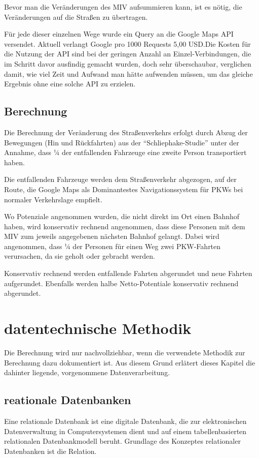 \documentclass[fontsize=12pt,a4paper]{scrreprt}
\begin{document}
Bevor man die Veränderungen des MIV aufsummieren kann, ist es nötig, die Veränderungen auf die Straßen zu übertragen.

Für jede dieser einzelnen Wege wurde ein Query an die Google Maps API versendet. Aktuell verlangt Google pro 1000 Requests 5,00 USD.\@ Die Kosten für die Nutzung der API sind bei der geringen Anzahl an Einzel-Verbindungen, die im Schritt davor ausfindig gemacht wurden, doch sehr überschaubar, verglichen damit, wie viel Zeit und Aufwand man hätte aufwenden müssen, um das gleiche Ergebnis ohne eine solche API zu erzielen.

\section{Berechnung}

Die Berechnung der Veränderung des Straßenverkehrs erfolgt durch Abzug der Bewegungen (Hin und Rückfahrten) aus der \enquote{Schliephake-Studie} unter der Annahme, dass ¼ der entfallenden Fahrzeuge eine zweite Person transportiert haben.

Die entfallenden Fahrzeuge werden dem Straßenverkehr abgezogen, auf der Route, die Google Maps als Dominantestes Navigationssystem für PKWs bei normaler Verkehrslage empfielt.

Wo Potenziale angenommen wurden, die nicht direkt im Ort einen Bahnhof haben, wird konservativ rechnend angenommen, dass diese Personen mit dem MIV zum jeweils angegebenen nächsten Bahnhof gelangt. Dabei wird angenommen, dass ¼ der Personen für einen Weg zwei PKW-Fahrten verursachen, da sie geholt oder gebracht werden.

Konservativ rechnend werden entfallende Fahrten abgerundet und neue Fahrten aufgerundet. Ebenfalls werden halbe Netto-Potentiale konservativ rechnend abgerundet.

\chapter{datentechnische Methodik}

Die Berechnung wird nur nachvollziehbar, wenn die verwendete Methodik zur Berechnung dazu dokumentiert ist. Aus diesem Grund erlätert dieses Kapitel die dahinter liegende, vorgenommene Datenverarbeitung.
\section{reationale Datenbanken}
Eine relationale Datenbank ist eine digitale Datenbank, die zur elektronischen Datenverwaltung in Computersystemen dient und auf einem tabellenbasierten relationalen Datenbankmodell beruht. Grundlage des Konzeptes relationaler Datenbanken ist die Relation.
\end{document}
